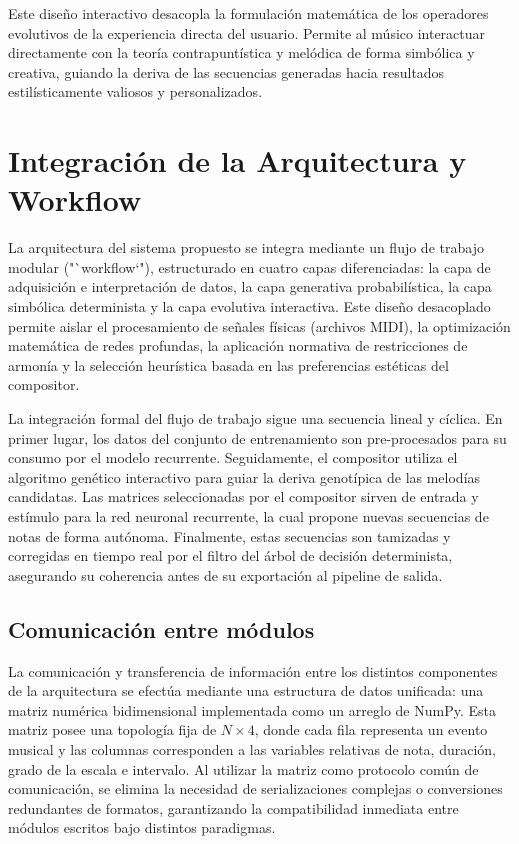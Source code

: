 \documentclass[12pt]{report}
\begin{document}
Este diseño interactivo desacopla la formulación matemática de los operadores evolutivos de la experiencia directa del usuario. Permite al músico interactuar directamente con la teoría contrapuntística y melódica de forma simbólica y creativa, guiando la deriva de las secuencias generadas hacia resultados estilísticamente valiosos y personalizados.

\section{Integración de la Arquitectura y Workflow}

La arquitectura del sistema propuesto se integra mediante un flujo de trabajo modular ("`workflow`"), estructurado en cuatro capas diferenciadas: la capa de adquisición e interpretación de datos, la capa generativa probabilística, la capa simbólica determinista y la capa evolutiva interactiva. Este diseño desacoplado permite aislar el procesamiento de señales físicas (archivos MIDI), la optimización matemática de redes profundas, la aplicación normativa de restricciones de armonía y la selección heurística basada en las preferencias estéticas del compositor. 

La integración formal del flujo de trabajo sigue una secuencia lineal y cíclica. En primer lugar, los datos del conjunto de entrenamiento son pre-procesados para su consumo por el modelo recurrente. Seguidamente, el compositor utiliza el algoritmo genético interactivo para guiar la deriva genotípica de las melodías candidatas. Las matrices seleccionadas por el compositor sirven de entrada y estímulo para la red neuronal recurrente, la cual propone nuevas secuencias de notas de forma autónoma. Finalmente, estas secuencias son tamizadas y corregidas en tiempo real por el filtro del árbol de decisión determinista, asegurando su coherencia antes de su exportación al pipeline de salida.

\subsection{Comunicación entre módulos}

La comunicación y transferencia de información entre los distintos componentes de la arquitectura se efectúa mediante una estructura de datos unificada: una matriz numérica bidimensional implementada como un arreglo de NumPy. Esta matriz posee una topología fija de $N \times 4$, donde cada fila representa un evento musical y las columnas corresponden a las variables relativas de nota, duración, grado de la escala e intervalo. Al utilizar la matriz como protocolo común de comunicación, se elimina la necesidad de serializaciones complejas o conversiones redundantes de formatos, garantizando la compatibilidad inmediata entre módulos escritos bajo distintos paradigmas.
\end{document}
